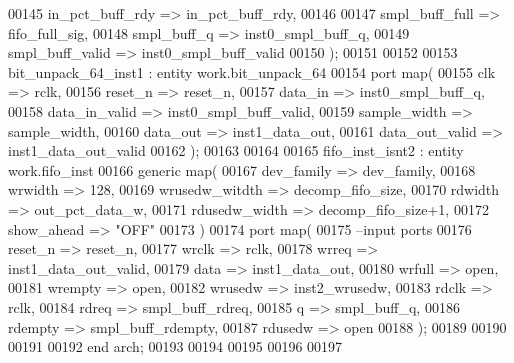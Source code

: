 \begin{DoxyCode}
00145       in_pct_buff_rdy   => in_pct_buff_rdy, 
00146       
00147       smpl_buff_full    => fifo_full_sig,
00148       smpl_buff_q       => inst0_smpl_buff_q,    
00149       smpl_buff_valid   => inst0_smpl_buff_valid
00150         \textcolor{vhdlchar}{)};
00151         
00152         
00153 bit\_unpack\_64\_inst1 : \textcolor{keywordflow}{entity} work.bit_unpack_64
00154   \textcolor{keywordflow}{port} \textcolor{keywordflow}{map}(
00155         clk             => rclk,
00156         reset_n         => reset_n,
00157         data_in         => inst0_smpl_buff_q,
00158         data_in_valid   => inst0_smpl_buff_valid,
00159         sample_width    => sample_width,
00160         data_out        => inst1_data_out,
00161         data_out_valid  => inst1_data_out_valid
00162         \textcolor{vhdlchar}{)};
00163         
00164         
00165    fifo\_inst\_isnt2 : \textcolor{keywordflow}{entity} work.fifo_inst
00166       \textcolor{keywordflow}{generic} \textcolor{keywordflow}{map}(
00167          dev_family     => dev_family,
00168          wrwidth         => \textcolor{vhdllogic}{128},
00169          wrusedw_witdth  => decomp_fifo_size,
00170          rdwidth         => out_pct_data_w,
00171          rdusedw_width   => decomp\_fifo\_size+1,
00172          show_ahead      => \textcolor{keyword}{"OFF"}
00173       \textcolor{vhdlchar}{)} 
00174       \textcolor{keywordflow}{port} \textcolor{keywordflow}{map}(
00175 \textcolor{keyword}{         --input ports }
00176          reset_n       => reset_n,
00177          wrclk         => rclk,
00178          wrreq         => inst1_data_out_valid,
00179          data          => inst1_data_out,
00180          wrfull        => \textcolor{keywordflow}{open},
00181          wrempty          => \textcolor{keywordflow}{open},
00182          wrusedw       => inst2_wrusedw,
00183          rdclk       => rclk,
00184          rdreq         => smpl_buff_rdreq,
00185          q             => smpl_buff_q,
00186          rdempty       => smpl_buff_rdempty,
00187          rdusedw       => \textcolor{keywordflow}{open}          
00188          \textcolor{vhdlchar}{)};
00189   
00190   
00191   
00192 \textcolor{keywordflow}{end} \textcolor{vhdlchar}{arch};   
00193 
00194 
00195 
00196 
00197 
\end{DoxyCode}
